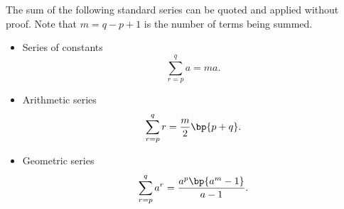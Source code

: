 \begin{fact}
    The sum of the following standard series can be quoted and applied without proof. Note that $m = q - p + 1$ is the number of terms being summed.

    \begin{itemize}
        \item Series of constants \[\sum_{r = p}^q a = ma.\]
        \item Arithmetic series \[\sum_{r = p}^q r = \frac{m}{2} \bp{p + q}.\]
        \item Geometric series \[\sum_{r = p}^q a^r = \frac{a^p \bp{a^m - 1}}{a - 1}.\]
    \end{itemize}
\end{fact}
